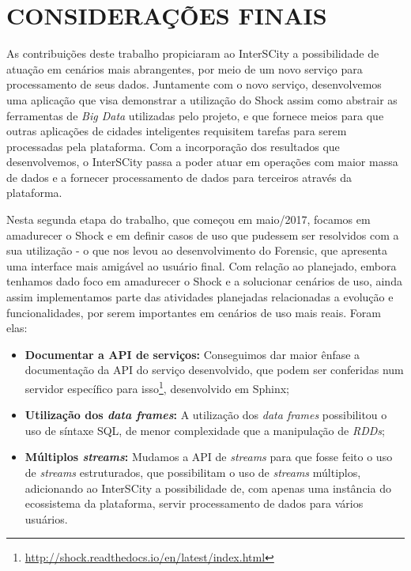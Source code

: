 \chapter{CONSIDERAÇÕES FINAIS}
\label{chapter:final}

As contribuições deste trabalho propiciaram ao InterSCity a possibilidade de
atuação em cenários mais abrangentes, por meio de um novo serviço
para processamento de seus dados. Juntamente com o novo serviço, desenvolvemos
uma aplicação que visa demonstrar a utilização do Shock assim como abstrair
as ferramentas de \textit{Big Data} utilizadas pelo projeto, e que fornece
meios para que outras aplicações de cidades inteligentes
requisitem tarefas para serem processadas pela plataforma. Com a incorporação
dos resultados que desenvolvemos, o InterSCity passa a poder atuar em
operações com maior massa de dados e a fornecer processamento de dados para
terceiros através da plataforma.

Nesta segunda etapa do trabalho, que começou em maio/2017, focamos em
amadurecer o Shock e em definir casos de uso que pudessem ser resolvidos com
a sua utilização - o que nos levou ao desenvolvimento do Forensic, que apresenta
uma interface mais amigável ao usuário final. Com relação ao planejado, embora
tenhamos dado foco em amadurecer o Shock e a solucionar cenários de uso, ainda
assim implementamos parte das atividades planejadas relacionadas a evolução e
funcionalidades, por serem importantes em cenários de uso mais reais. Foram
elas:

\begin{itemize}
    \item \textbf{Documentar a API de serviços:} Conseguimos dar maior ênfase a
        documentação da API do serviço desenvolvido, que podem ser conferidas
        num servidor específico para isso\footnote{\url{http://shock.readthedocs.io/en/latest/index.html}},
        desenvolvido em Sphinx;
    \item \textbf{Utilização dos \textit{data frames}:} A utilização dos
        \textit{data frames} possibilitou o uso de síntaxe SQL, de menor
        complexidade que a manipulação de \textit{RDDs};
    \item \textbf{Múltiplos \textit{streams}:} Mudamos a API de \textit{streams}
        para que fosse feito o uso de \textit{streams} estruturados, que
        possibilitam o uso de \textit{streams} múltiplos, adicionando ao
        InterSCity a possibilidade de, com apenas uma instância do ecossistema
        da plataforma, servir processamento de dados para vários usuários.
\end{itemize}

